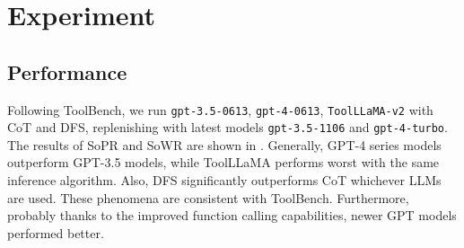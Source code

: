 \section{Experiment}

\subsection{Performance}\label{sec:performance}

Following ToolBench, we run \texttt{gpt-3.5-0613}, \texttt{gpt-4-0613}, \texttt{ToolLLaMA-v2} with CoT and DFS, replenishing with latest models \texttt{gpt-3.5-1106} and \texttt{gpt-4-turbo}.  
The results of SoPR and SoWR are shown in . Generally, GPT-4 series models outperform GPT-3.5 models, while ToolLLaMA performs worst with the same inference algorithm.
Also, DFS significantly outperforms CoT whichever LLMs are used.
These phenomena are consistent with ToolBench.
Furthermore, probably thanks to the improved function calling capabilities, newer GPT models performed better. 
